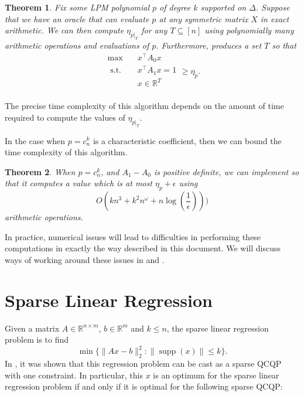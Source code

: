 \documentclass{amsart}
\newtheorem{theorem}{Theorem}[section]
\theoremstyle{definition}
\newcommand{\R}{\mathbb{R}}
\DeclareMathOperator*{\supp}{supp}
\newcommand{\st}{{\text{ s.t. }}}
\begin{document}
\begin{theorem}
    \label{thm:greedy_works}
    Fix some LPM polynomial $p$ of degree $k$ supported on $\Delta$.
    Suppose that we have an oracle that can evaluate $p$ at any symmetric matrix $X$ in exact arithmetic.
    We can then compute $\eta_{p|_{T}}$ for any $T \subseteq [n]$ using polynomially many arithmetic operations and evaluations of $p$.
    Furthermore,  produces a set $T$ so that
    \begin{equation}
        \begin{aligned}
            \max\quad & x^{\intercal}A_0x\\
            \st & x^{\intercal}A_1x = 1\\
                & x \in \R^T\\
        \end{aligned}
        \ge \eta_p.
    \end{equation}
\end{theorem}
The precise time complexity of this algorithm depends on the amount of time required to compute the values of $\eta_{p|_T}$.

In the case when $p = c_n^k$ is a characteristic coefficient, then we can bound the time complexity of this algorithm.
\begin{theorem}
    \label{thm:characteristic}
    When $p = c_n^k$, and $A_1 - A_0$ is positive definite, we can implement  so that it computes a value which is at most $\eta_p + \epsilon$ using
    \[
        O(kn^3 + k^2n^{\omega} + n\log(\frac{1}{\epsilon})))
    \]
    arithmetic operations.
\end{theorem}

In practice, numerical issues will lead to difficulties in performing these computations in exactly the way described in this document. We will discuss ways of working around these issues in  and .



\section{Sparse Linear Regression}
\label{sec:sparseReg}
Given a matrix $A \in \R^{n \times m}$, $b \in \R^m$ and $k \le n$, the sparse linear regression problem is to find
\[
    \min \{ \|A x - b\|_2^2 : \|\supp(x)\| \le k\}.
\]
In \cite{ben2022new}, it was shown that this regression problem can be cast as a sparse QCQP with one constraint. In particular, this $x$ is an optimum for the sparse linear regression problem if and only if it is optimal for the following sparse QCQP:
\end{document}
